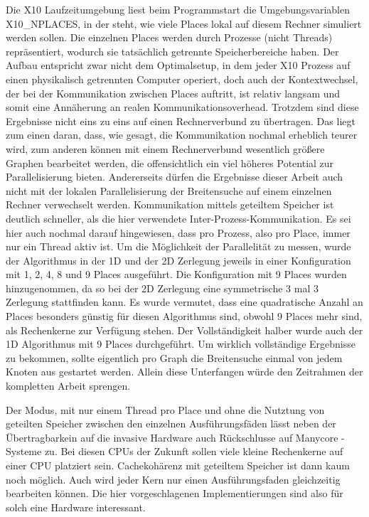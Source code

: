 Die X10 Laufzeitumgebung liest beim Programmstart die Umgebungsvariablen X10\_NPLACES, in der steht, wie viele Places lokal auf diesem Rechner simuliert werden sollen. Die einzelnen Places werden durch Prozesse (nicht Threads) repräsentiert, wodurch sie tatsächlich getrennte Speicherbereiche haben. Der Aufbau entspricht zwar nicht dem Optimalsetup, in dem jeder X10 Prozess auf einen physikalisch getrennten Computer operiert, doch auch der Kontextwechsel, der bei der Kommunikation zwischen Places auftritt, ist relativ langsam und somit eine Annäherung an realen Kommunikationsoverhead. Trotzdem sind diese Ergebnisse nicht eins zu eins auf einen Rechnerverbund zu übertragen. Das liegt zum einen daran, dass, wie gesagt, die Kommunikation nochmal erheblich teurer wird, zum anderen können mit einem Rechnerverbund wesentlich größere Graphen bearbeitet werden, die offensichtlich ein viel höheres Potential zur Parallelisierung bieten. Andererseits dürfen die Ergebnisse dieser Arbeit auch nicht mit der lokalen Parallelisierung der Breitensuche auf einem einzelnen Rechner verwechselt werden. Kommunikation mittels geteiltem Speicher ist deutlich schneller, als die hier verwendete Inter-Prozess-Kommunikation. Es sei hier auch nochmal darauf hingewiesen, dass pro Prozess, also pro Place, immer nur ein Thread aktiv ist.
Um die Möglichkeit der Parallelität zu messen, wurde der Algorithmus in der 1D und der 2D Zerlegung jeweils in einer Konfiguration mit 1, 2, 4, 8 und 9 Places ausgeführt. Die Konfiguration mit 9 Places wurden hinzugenommen, da so bei der 2D Zerlegung eine symmetrische 3 mal 3 Zerlegung stattfinden kann. Es wurde vermutet, dass eine quadratische Anzahl an Places besonders günstig für diesen Algorithmus sind, obwohl 9 Places mehr sind, als Rechenkerne zur Verfügung stehen. Der Vollständigkeit halber wurde auch der 1D Algorithmus mit 9 Places durchgeführt. Um wirklich vollständige Ergebnisse zu bekommen, sollte eigentlich pro Graph die Breitensuche einmal von jedem Knoten aus gestartet werden. Allein diese Unterfangen würde den Zeitrahmen der kompletten Arbeit sprengen.

Der Modus, mit nur einem Thread pro Place und ohne die Nutztung von geteilten Speicher zwischen den einzelnen Ausführungsfäden lässt neben der Übertragbarkein auf die invasive Hardware auch Rückschlusse auf Manycore - Systeme zu. Bei diesen CPUs der Zukunft sollen viele kleine Rechenkerne auf einer CPU platziert sein. Cachekohärenz mit geteiltem Speicher ist dann kaum noch möglich. Auch wird jeder Kern nur einen Ausführungsfaden gleichzeitig bearbeiten können. Die hier vorgeschlagenen Implementierungen sind also für solch eine Hardware interessant.

